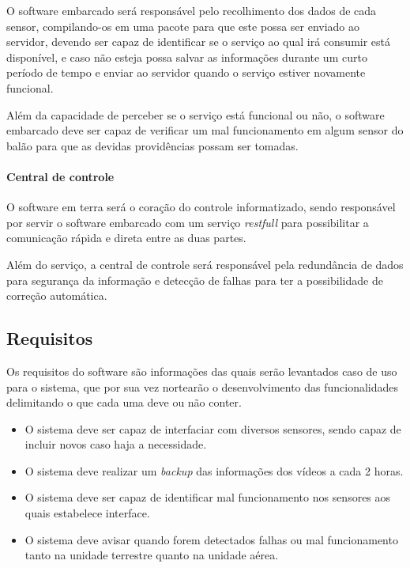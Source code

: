 O software embarcado será responsável pelo recolhimento dos dados de cada sensor, compilando-os em uma pacote para que este possa ser enviado ao servidor, devendo ser capaz de identificar se o serviço ao qual irá consumir está disponível, e caso não esteja possa salvar as informações durante um curto período de tempo e enviar ao servidor quando o serviço estiver novamente funcional.

Além da capacidade de perceber se o serviço está funcional ou não, o software embarcado deve ser capaz de verificar um mal funcionamento em algum sensor do balão para que as devidas providências possam ser tomadas.

\paragraph{Central de controle}

O software em terra será o coração do controle informatizado, sendo responsável por servir o software embarcado com um serviço \textit{restfull} para possibilitar a comunicação rápida e direta entre as duas partes.

Além do serviço, a central de controle será responsável pela redundância de dados para segurança da informação e detecção de falhas para ter a possibilidade de correção automática.

\subsection{Requisitos}

Os requisitos do software são informações das quais serão levantados caso de uso para o sistema, que por sua vez nortearão o desenvolvimento das funcionalidades delimitando o que cada uma deve ou não conter.

\begin{itemize}
  \item O sistema deve ser capaz de interfaciar com diversos sensores, sendo capaz de incluir novos caso haja a necessidade.
  \item O sistema deve realizar um \textit{backup} das informações dos vídeos a cada 2 horas.
  \item O sistema deve ser capaz de identificar mal funcionamento nos sensores aos quais estabelece interface.
  \item O sistema deve avisar quando forem detectados falhas ou mal funcionamento tanto na unidade terrestre quanto na unidade aérea.
\end{itemize}


